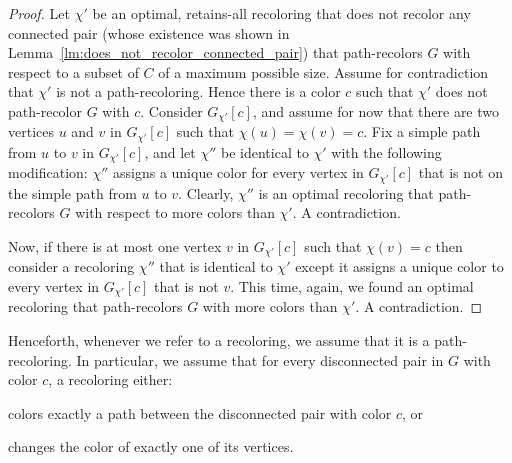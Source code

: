 \begin{proof}
Let $\chi'$ be an optimal, 
retains-all recoloring that does not recolor any connected pair 
(whose existence was shown in Lemma~\ref{lm:does_not_recolor_connected_pair}) 
that path-recolors $G$ with respect to a subset of $C$ of a maximum possible size. 
%
Assume for contradiction that $\chi'$ is not a path-recoloring.  
%
Hence there is a color $c$ such that $\chi'$ does not path-recolor $G$ with $c$.
%
Consider $G_{\chi'}[c]$, 
and assume for now that there are two vertices $u$
and $v$ in $G_{\chi'}[c]$ such that $\chi(u) = \chi(v) = c$.  
%
Fix a simple path from $u$ to $v$ in $G_{\chi'}[c]$, 
and let $\chi''$ be identical to $\chi'$ with the following modification: 
$\chi''$ assigns a unique color for every vertex in $G_{\chi'}[c]$ 
that is not on the simple path from $u$ to $v$.
%
Clearly, 
$\chi''$ is an optimal recoloring that path-recolors 
$G$ with respect to more colors than $\chi'$.  
%
A contradiction.
	
Now,
if there is at most one vertex $v$ in $G_{\chi'}[c]$ such that $\chi(v) = c$ 
then consider a recoloring $\chi''$ that is identical to $\chi'$ 
except it assigns a unique color to every vertex in $G_{\chi'}[c]$ that is not $v$.
%
This time, 
again, 
we found an optimal recoloring that path-recolors $G$ with more colors than $\chi'$.  
%
A contradiction.
{}\end{proof}

Henceforth, 
whenever we refer to a recoloring, 
we assume that it is a path-recoloring.
In particular, 
we assume that for every disconnected pair in $G$ with color $c$, 
a recoloring either:
\begin{inparaenum}[(i)]
	\item colors exactly a path between the disconnected pair with color $c$, or
	\item changes the color of exactly one of its vertices. 
\end{inparaenum}
